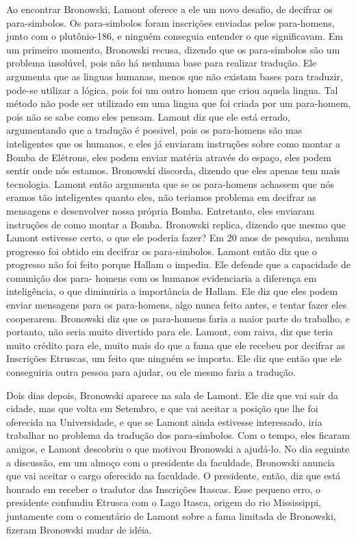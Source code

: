 \documentclass[14pt,portuguese]{extreport}
\begin{document}
	  Ao encontrar Bronowski, Lamont oferece a ele um novo desafio, de decifrar os para-simbolos. 
	  Os para-simbolos foram inscrições enviadas pelos para-homens, junto com o plutônio-186, e 
	  ninguém conseguia entender o que significavam. Em um primeiro momento, Bronowski recusa, 
	  dizendo que os para-simbolos são um problema insolúvel, pois não há nenhuma base para 
	  realizar tradução. Ele argumenta que as linguas humanas, menos que não existam bases para 
	  traduzir, pode-se utilizar a lógica, pois foi um outro homem que criou aquela lingua. Tal 
	  método não pode ser utilizado em uma lingua que foi criada por um para-homem, pois não se 
	  sabe como eles pensam. Lamont diz que ele está errado, argumentando que a tradução é 
	  possivel, pois os para-homens são mas inteligentes que os humanos, e eles já enviaram 
	  instruções sobre como montar a Bomba de Elétrons, eles podem enviar matéria através do 
	  espaço, eles podem sentir onde nós estamos. Bronowski discorda, dizendo que eles apenas tem 
	  mais tecnologia. Lamont então argumenta que se os para-homens achassem que nós eramos tão 
	  inteligentes quanto eles, não teriamos problema em decifrar as mensagens e desenvolver nossa 
	  própria Bomba. Entretanto, eles enviaram instruções de como montar a Bomba. Bronowski replica,
	  dizendo que mesmo que Lamont estivesse certo, o que ele poderia fazer? Em 20 anos de pesquisa,
	  nenhum progresso foi obtido em decifrar os para-simbolos. Lamont então diz que o progresso 
	  não foi feito porque Hallam o impediu. Ele defende que a capacidade de comunição dos para-
	  homens com os humanos evidenciaria a diferença em inteligência, o que diminuiria a importância 
	  de Hallam. Ele diz que eles podem enviar mensagens para os para-homens, algo nunca feito 
	  antes, e tentar fazer eles cooperarem. Bronowski diz que os para-homens faria a maior parte 
	  do trabalho, e portanto, não seria muito divertido para ele. Lamont, com raiva, diz que 
	  teria muito crédito para ele, muito mais do que a fama que ele recebeu por decifrar as 
	  Inscrições Etruscas, um feito que ninguém se importa. Ele diz que então que ele conseguiria 
	  outra pessoa para ajudar, ou ele mesmo faria a tradução.
	
	  Dois dias depois, Bronowski aparece na sala de Lamont. Ele diz que vai sair da cidade, mas 
	  que volta em Setembro, e que vai aceitar a posição que lhe foi oferecida na Universidade, e 
	  que se Lamont ainda estivesse interessado, iria trabalhar no problema da tradução dos 
	  para-simbolos. Com o tempo, eles ficaram amigos, e Lamont descobriu o que motivou Bronowski 
	  a ajudá-lo. No dia seguinte a discussão, em um almoço com o presidente da faculdade, 
	  Bronowski anuncia que vai aceitar o cargo oferecido na faculdade. O presidente, então, diz 
	  que está honrado em receber o tradutor das Inscrições Itascas. Esse pequeno erro, o 
	  presidente confundiu Etrusca com o Lago Itasca, origem do rio Mississippi, juntamente com o 
	  comentário de Lamont sobre a fama limitada de Bronowski, fizeram Bronowski mudar de idéia.
\end{document}
